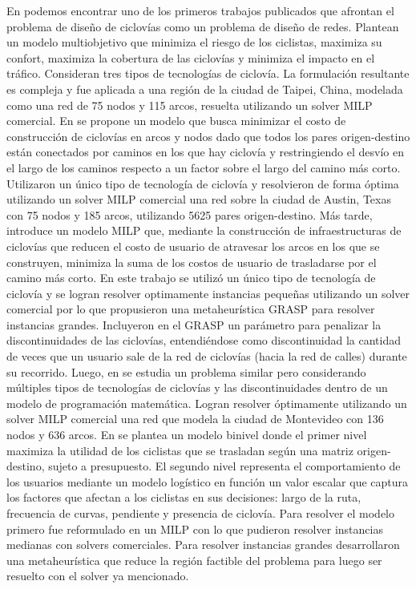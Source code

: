 \documentclass{article}
\begin{document}
  En \cite{Lin2013} podemos encontrar uno de los primeros trabajos publicados que afrontan el problema de diseño de ciclovías como un problema de diseño de redes. Plantean un modelo multiobjetivo que minimiza el riesgo de los ciclistas, maximiza su confort, maximiza la cobertura de las ciclovías y minimiza el impacto en el tráfico. Consideran tres tipos de tecnologías de ciclovía. La formulación resultante es compleja y fue aplicada a una región de la ciudad de Taipei, China, modelada como una red de 75 nodos y 115 arcos, resuelta utilizando un solver MILP comercial. En \cite{Duthie2014} se propone un modelo que busca minimizar el costo de construcción de ciclovías en arcos y nodos dado que todos los pares origen-destino están conectados por caminos en los que hay ciclovía y restringiendo el desvío en el largo de los caminos respecto a un factor sobre el largo del camino más corto. Utilizaron un único tipo de tecnología de ciclovía y resolvieron de forma óptima utilizando un solver MILP comercial una red sobre la ciudad de Austin, Texas con 75 nodos y 185 arcos, utilizando 5625 pares origen-destino. Más tarde, \cite{mauttone2017} introduce un modelo MILP que, mediante la construcción de infraestructuras de ciclovías que reducen el costo de usuario de atravesar los arcos en los que se construyen, minimiza la suma de los costos de usuario de trasladarse por el camino más corto. En este trabajo se utilizó un único tipo de tecnología de ciclovía y se logran resolver optimamente instancias pequeñas utilizando un solver comercial por lo que propusieron una metaheurística GRASP para resolver instancias grandes. Incluyeron en el GRASP un parámetro para penalizar la discontinuidades de las ciclovías, entendiéndose como discontinuidad la cantidad de veces que un usuario sale de la red de ciclovías (hacia la red de calles) durante su recorrido. Luego, en \cite{baya2021} se estudia un problema similar pero considerando múltiples tipos de tecnologías de ciclovías y las discontinuidades dentro de un modelo de programación matemática. Logran resolver óptimamente utilizando un solver MILP comercial una red que modela la ciudad de Montevideo con 136 nodos y 636 arcos. En \cite{liu2019} se plantea un modelo binivel donde el primer nivel maximiza la utilidad de los ciclistas que se trasladan según una matriz origen-destino, sujeto a presupuesto. El segundo nivel representa el comportamiento de los usuarios mediante un modelo logístico en función un valor escalar que captura los factores que afectan a los ciclistas en sus decisiones: largo de la ruta, frecuencia de curvas, pendiente y presencia de ciclovía. Para resolver el modelo primero fue reformulado en un MILP con lo que pudieron resolver instancias medianas con solvers comerciales. Para resolver instancias grandes desarrollaron una metaheurística que reduce la región factible del problema para luego ser resuelto con el solver ya mencionado.
\end{document}
